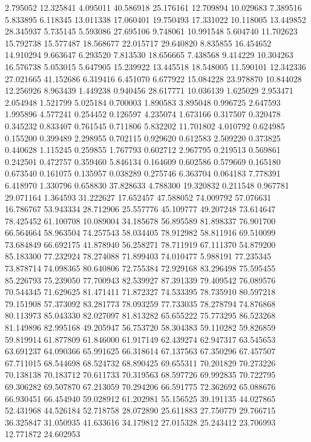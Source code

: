 2.795052
12.325841
4.095011
40.586918
25.176161
12.709894
10.029683
7.389516
5.833895
6.118345
13.011338
17.060401
19.750493
17.331022
10.118005
13.449852
28.345937
5.735145
5.593086
27.695106
9.748061
10.991548
5.604740
11.702623
15.792738
15.577487
18.568677
22.015717
29.640820
8.835855
16.454652
14.910294
9.663647
6.293520
7.813530
18.656665
7.438568
9.414229
10.304263
16.576738
5.053015
5.647905
15.239922
13.445518
18.548005
11.590101
12.342336
27.021665
41.152686
6.319416
6.451070
6.677922
15.084228
23.978870
10.844028
12.256926
8.963439
1.449238
0.940456
28.617771
10.036139
1.625029
2.953471
2.054948
1.521799
5.025184
0.700003
1.890583
3.895048
0.996725
2.647593
1.995896
4.577241
0.254452
0.126597
4.235074
1.673166
0.317507
0.320478
0.345232
0.833407
0.761545
0.711806
5.832202
11.701802
4.010792
0.624985
0.155200
0.399489
2.298955
0.702115
0.929620
0.612583
2.509220
0.373825
0.440628
1.115245
0.259855
1.767793
0.602712
2.967795
0.219513
0.569861
0.242501
0.472757
0.359460
5.846134
0.164609
0.602586
0.579669
0.165180
0.673540
0.161075
0.135957
0.038289
0.275746
6.363704
0.064183
7.778391
6.418970
1.330796
0.658830
37.828633
4.788300
19.320832
0.211548
0.967781
29.071164
1.364593
31.222627
17.652457
47.588052
74.009792
57.076631
16.786767
53.943334
28.712906
25.557776
45.109777
49.207248
73.614647
78.425452
61.100708
10.089004
34.185678
56.895589
81.898337
76.901700
66.564664
58.963504
74.257543
58.034405
78.912982
58.811916
69.510099
73.684849
66.692175
41.878940
56.258271
78.711919
67.111370
54.879200
85.183300
77.232924
78.274088
71.899403
74.010477
5.988191
77.235345
73.878714
74.098365
80.640806
72.755384
72.929168
83.296498
75.595455
85.226793
75.239050
77.700943
82.539927
87.391339
79.409542
76.089576
70.544345
71.629625
81.471411
71.872327
74.533395
78.735910
80.597218
79.151908
57.373092
83.281773
78.093259
77.733035
78.278794
74.876868
80.113973
85.043330
82.027097
81.813282
65.655222
75.773295
86.523268
81.149896
82.995168
49.205947
56.753720
58.304383
59.110282
59.826859
59.819914
61.877809
61.846000
61.917149
62.439274
62.947317
63.545653
63.691237
64.090366
65.991625
66.318614
67.137563
67.350296
67.457507
67.711015
68.544698
68.524732
68.890425
69.655311
70.201829
70.273226
70.138138
70.183712
70.611733
70.319563
68.597726
69.992835
70.722795
69.306282
69.507870
67.213059
70.294206
66.591775
72.362692
65.088676
66.930451
66.454940
59.028912
61.202981
55.156525
39.191135
44.027865
52.431968
44.526184
52.718758
28.072890
25.611883
27.750779
29.766715
36.325847
31.050935
41.633616
34.179812
27.015328
25.243412
23.706993
12.771872
24.602953
